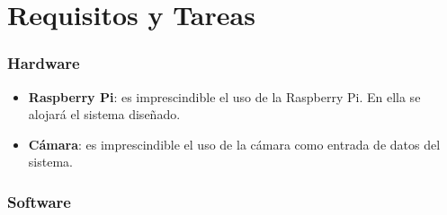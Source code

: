 \chapter{\textbf{Requisitos y Tareas}}
\label{chapter:requisitos}

\subsection*{Hardware}
{}
\vspace{5mm}

\begin{itemize}
    \item \textbf{Raspberry Pi}: es imprescindible el uso de la Raspberry Pi. En ella se alojará el sistema diseñado.
    \item \textbf{Cámara}: es imprescindible el uso de la cámara como entrada de datos del sistema.
\end{itemize}

\subsection*{Software}
{}
\vspace{5mm}


